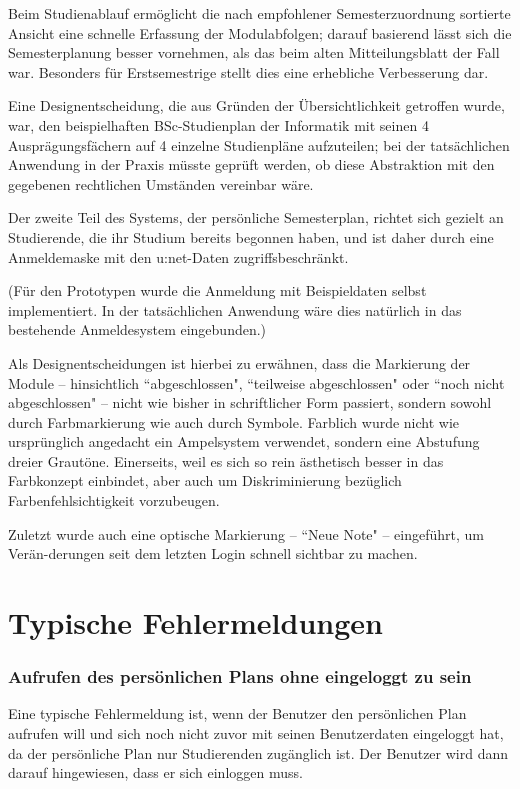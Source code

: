 \documentclass[a4paper,10pt]{scrartcl}
\begin{document}
Beim Studienablauf ermöglicht die nach empfohlener Semesterzuordnung sortierte Ansicht eine schnelle Erfassung der Modulabfolgen; darauf basierend lässt sich die Semesterplanung besser vornehmen, als das beim alten Mitteilungsblatt der Fall war. Besonders für Erstsemestrige stellt dies eine erhebliche Verbesserung dar.

Eine Designentscheidung, die aus Gründen der Übersichtlichkeit getroffen wurde, war, den beispielhaften BSc-Studienplan der Informatik mit seinen 4 Ausprägungsfächern auf 4 einzelne Studienpläne aufzuteilen; bei der tatsächlichen Anwendung in der Praxis müsste geprüft werden, ob diese Abstraktion mit den gegebenen rechtlichen Umständen vereinbar wäre.

Der zweite Teil des Systems, der persönliche Semesterplan, richtet sich gezielt an Studierende, die ihr Studium bereits begonnen haben, und ist daher durch eine Anmeldemaske mit den u:net-Daten zugriffsbeschränkt.

(Für den Prototypen wurde die Anmeldung mit Beispieldaten selbst implementiert. In der tatsächlichen Anwendung wäre dies natürlich in das bestehende Anmeldesystem eingebunden.)

Als Designentscheidungen ist hierbei zu erwähnen, dass die Markierung der Module – hinsichtlich ``abgeschlossen", ``teilweise abgeschlossen" oder ``noch nicht abgeschlossen" – nicht wie bisher in schriftlicher Form passiert, sondern sowohl durch Farbmarkierung wie auch durch Symbole. Farblich wurde nicht wie ursprünglich angedacht ein Ampelsystem verwendet, sondern eine Abstufung dreier Grautöne. Einerseits, weil es sich so rein ästhetisch besser in das Farbkonzept einbindet, aber auch um Diskriminierung bezüglich Farbenfehlsichtigkeit vorzubeugen.

Zuletzt wurde auch eine optische Markierung – ``Neue Note" – eingeführt, um Verän-derungen seit dem letzten Login schnell sichtbar zu machen.

\section*{Typische Fehlermeldungen}

\subsubsection*{Aufrufen des persönlichen Plans ohne eingeloggt zu sein}

Eine typische Fehlermeldung ist, wenn der Benutzer den persönlichen Plan aufrufen will und sich noch nicht zuvor mit seinen Benutzerdaten eingeloggt hat,
da der persönliche Plan nur Studierenden zugänglich ist. Der Benutzer wird dann darauf hingewiesen, dass er sich einloggen muss.
\end{document}
